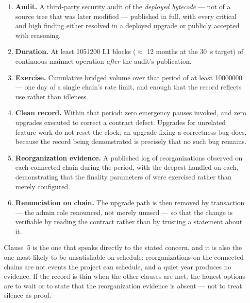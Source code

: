 \begin{remark}
\begin{remark}
\begin{enumerate}
  \item \textbf{Audit.} A third-party security audit of the \emph{deployed bytecode} --- not of a
  source tree that was later modified --- published in full, with every critical and high finding
  either resolved in a deployed upgrade or publicly accepted with reasoning.
  \item \textbf{Duration.} At least \num{1051200} L1 blocks ($\approx$ 12 months at the
  \SI{30}{\second} target) of continuous mainnet operation \emph{after} the audit's publication.
  \item \textbf{Exercise.} Cumulative bridged volume over that period of at least
  \num{10000000}\flux{} --- one day of a single chain's rate limit, and enough that the record reflects
  use rather than idleness.
  \item \textbf{Clean record.} Within that period: zero emergency pauses invoked, and zero upgrades
  executed to correct a contract defect. Upgrades for unrelated feature work do not reset the clock;
  an upgrade fixing a correctness bug does, because the record being demonstrated is precisely that
  no such bug remains.
  \item \textbf{Reorganization evidence.} A published log of reorganizations observed on each
  connected chain during the period, with the deepest handled on each, demonstrating that the
  finality parameters of  were exercised rather than merely configured.
  \item \textbf{Renunciation on chain.} The upgrade path is then removed by transaction --- the
  admin role renounced, not merely unused --- so that the change is verifiable by reading the
  contract rather than by trusting a statement about it.
\end{enumerate}

Clause~5 is the one that speaks directly to the stated concern, and it is also the one most likely to
be unsatisfiable on schedule: reorganizations on the connected chains are not events the project can
schedule, and a quiet year produces no evidence. If the record is thin when the other clauses are
met, the honest options are to wait or to state that the reorganization evidence is absent --- not to
treat silence as proof.


\end{remark}
\end{remark}
